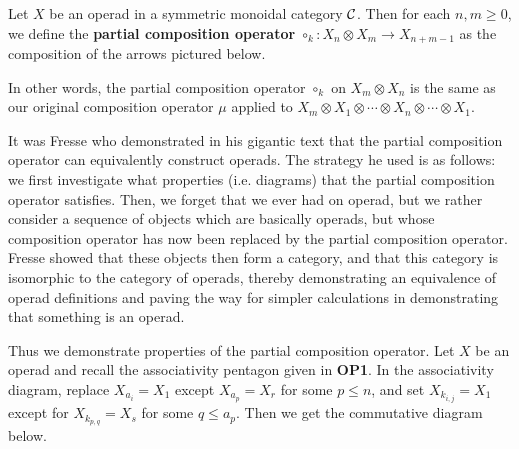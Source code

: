 \begin{definition}
    Let $X$ be an operad in a symmetric monoidal category $\mathcal{C}$. Then 
    for each $n, m \ge 0$,
    we define the \textbf{partial composition operator} $\circ_k: X_n \otimes X_m \to X_{n + m - 1}$ 
    as the composition of the arrows pictured below. 
    \begin{center}
    \end{center}
    In other words, the partial composition operator $\circ_k$ on $X_m \otimes X_n$ is the same as our original
    composition operator $\mu$ applied to $X_m \otimes X_1 \otimes \cdots \otimes X_n \otimes \cdots \otimes X_1$.
\end{definition}

It was Fresse who demonstrated in his gigantic text that the partial composition operator 
can equivalently construct operads. The strategy he used is as follows: we first investigate what 
properties (i.e. diagrams) that the partial composition operator satisfies. Then, we forget that we ever had 
on operad, but we rather consider a sequence of objects which are basically operads, but whose 
composition operator has now been replaced by the partial composition operator. Fresse showed that these 
objects then form a category, and that this category is isomorphic to the category of operads, thereby 
demonstrating an equivalence of operad definitions and paving the way for simpler calculations in demonstrating 
that something is an operad. 

Thus we demonstrate properties of the partial composition operator. Let 
$X$ be an operad and recall the associativity pentagon given in \textbf{OP1}. 
In the associativity diagram, 
replace $X_{a_i} = X_1$ except $X_{a_p} = X_r$
for some $p \le n$, and set $X_{k_{i,j}} = X_1$ 
except for $X_{k_{p,q}} = X_s$ for some $q \le a_p$. Then we get 
the commutative diagram below. 


